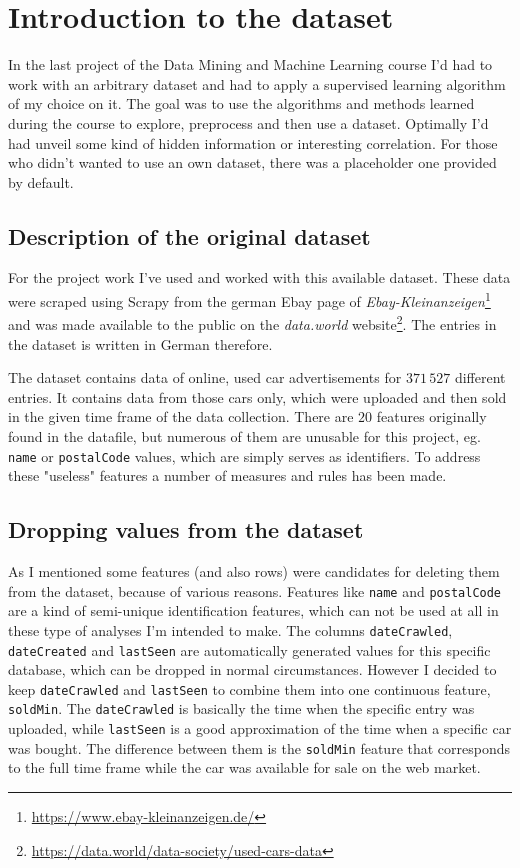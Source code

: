 \section{Introduction to the dataset}

In the last project of the Data Mining and Machine Learning course I'd had to work with an arbitrary dataset and had to apply a supervised learning algorithm of my choice on it. The goal was to use the algorithms and methods learned during the course to explore, preprocess and then use a dataset. Optimally I'd had unveil some kind of hidden information or interesting correlation. For those who didn't wanted to use an own dataset, there was a placeholder one provided by default.

\subsection{Description of the original dataset}
For the project work I've used and worked with this available dataset. These data were scraped using Scrapy from the german Ebay page of \textit{Ebay-Kleinanzeigen}\footnote{\url{https://www.ebay-kleinanzeigen.de/}} and was made available to the public on the \textit{data.world} website\footnote{\url{https://data.world/data-society/used-cars-data}}. The entries in the dataset is written in German therefore.

The dataset contains data of online, used car advertisements for $371\,527$ different entries. It contains data from those cars only, which were uploaded and then sold in the given time frame of the data collection. There are $20$ features originally found in the datafile, but numerous of them are unusable for this project, eg. \texttt{name} or \texttt{postalCode} values, which are simply serves as identifiers. To address these "useless" features a number of measures and rules has been made.

\subsection{Dropping values from the dataset}
As I mentioned some features (and also rows) were candidates for deleting them from the dataset, because of various reasons. Features like \texttt{name} and \texttt{postalCode} are a kind of semi-unique identification features, which can not be used at all in these type of analyses I'm intended to make. The columns \texttt{dateCrawled}, \texttt{dateCreated} and \texttt{lastSeen} are automatically generated values for this specific database, which can be dropped in normal circumstances. However I decided to keep \texttt{dateCrawled} and \texttt{lastSeen} to combine them into one continuous feature, \texttt{soldMin}. The \texttt{dateCrawled} is basically the time when the specific entry was uploaded, while \texttt{lastSeen} is a good approximation of the time when a specific car was bought. The difference between them is the \texttt{soldMin} feature that corresponds to the full time frame while the car was available for sale on the web market.

